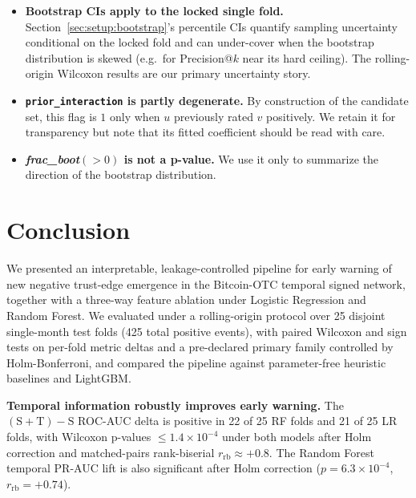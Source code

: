 \documentclass[conference]{IEEEtran}
\newcommand{\code}[1]{\texttt{#1}}
\begin{document}
\begin{itemize}
graph uses the latest rating per pair; this represents current trust
judgment but discards multi-event nuance. We restore the full event
history only for temporal and trust-summary features.
\item \textbf{Bootstrap CIs apply to the locked single fold.}
Section~\ref{sec:setup:bootstrap}'s percentile CIs quantify sampling
uncertainty conditional on the locked fold and can under-cover when
the bootstrap distribution is skewed (e.g.\ for Precision@$k$ near
its hard ceiling). The rolling-origin Wilcoxon results are our
primary uncertainty story.
\item \textbf{\code{prior\_interaction} is partly degenerate.} By
construction of the candidate set, this flag is $1$ only when $u$
previously rated $v$ positively. We retain it for transparency but
note that its fitted coefficient should be read with care.
\item \textbf{\emph{frac\_boot}$(>0)$ is not a p-value.} We use it
only to summarize the direction of the bootstrap distribution.
\end{itemize}

\section{Conclusion}

We presented an interpretable, leakage-controlled pipeline for early
warning of new negative trust-edge emergence in the Bitcoin-OTC
temporal signed network, together with a three-way feature ablation
under Logistic Regression and Random Forest. We evaluated under a
rolling-origin protocol over 25 disjoint single-month test folds
(425 total positive events), with paired Wilcoxon and sign tests on
per-fold metric deltas and a pre-declared primary family controlled
by Holm-Bonferroni, and compared the pipeline against parameter-free
heuristic baselines and LightGBM.

\textbf{Temporal information robustly improves early warning.} The
$(\mathrm{S}{+}\mathrm{T}) - \mathrm{S}$ ROC-AUC delta is positive
in 22 of 25 RF folds and 21 of 25 LR folds, with Wilcoxon p-values
$\leq 1.4\!\times\!10^{-4}$ under both models after Holm correction
and matched-pairs rank-biserial $r_{\mathrm{rb}} \approx +0.8$. The
Random Forest temporal PR-AUC lift is also significant after Holm
correction ($p = 6.3\!\times\!10^{-4}$,
$r_{\mathrm{rb}} = +0.74$).
\end{document}
